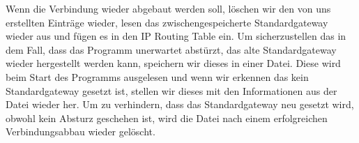 \newline
\newline
Wenn die Verbindung wieder abgebaut werden soll, löschen wir den von uns erstellten Einträge wieder, lesen das zwischengespeicherte Standardgateway wieder aus und fügen es in den IP Routing Table ein.
\newline
\newline
Um sicherzustellen das in dem Fall, dass das Programm unerwartet abstürzt, das alte Standardgateway wieder hergestellt werden kann, speichern wir dieses in einer Datei. Diese wird beim Start des Programms ausgelesen und wenn wir erkennen das kein Standardgateway gesetzt ist, stellen wir dieses mit den Informationen aus der Datei wieder her. Um zu verhindern, dass das Standardgateway neu gesetzt wird, obwohl kein Absturz geschehen ist, wird die Datei nach einem erfolgreichen Verbindungsabbau wieder gelöscht.



